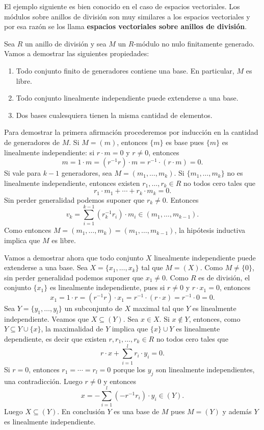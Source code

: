 El ejemplo siguiente es bien conocido en el caso de espacios vectoriales. Los módulos
sobre anillos de división son muy similares a los espacios vectoriales 
y por esa razón se los llama 
\textbf{espacios vectoriales sobre anillos de división}.

\begin{example}
Sea $R$ un anillo de división y sea $M$ un $R$-módulo no nulo finitamente generado. 
Vamos a demostrar las siguientes propiedades: 
\begin{enumerate}
\item Todo conjunto finito de generadores contiene una base. En particular, $M$ es libre. 
\item Todo conjunto linealmente independiente puede extenderse a una base.
\item Dos bases cualesquiera tienen la misma cantidad de elementos. 
\end{enumerate}

Para demostrar la primera afirmación procederemos por inducción en la cantidad de generadores de $M$. Si $M=(m)$, entonces
$\{m\}$ es base pues $\{m\}$ es linealmente independiente: si $r\cdot m=0$ y $r\ne 0$, entonces
\[
m=1\cdot m=(r^{-1}r)\cdot m=r^{-1}\cdot (r\cdot m)=0.
\]
Si vale para $k-1$ generadores, sea $M=(m_1,\dots,m_k)$. Si $\{m_1,\dots,m_k\}$ no es linealmente
independiente, entonces existen $r_1,\dots,r_k\in R$ no todos cero tales
que
\[
r_1\cdot m_1+\cdots+r_k\cdot m_k=0.
\]
Sin perder generalidad podemos suponer que $r_k\ne 0$. Entonces
\[
v_k=\sum_{i=1}^{k-1} (r_k^{-1}r_i)\cdot m_i\in (m_1,\dots,m_{k-1}).
\]
Como entonces $M=(m_1,\dots,m_k)=(m_1,\dots,m_{k-1})$, la hipótesis inductiva implica que
$M$ es libre. 

Vamos a demostrar ahora que todo
conjunto $X$ linealmente independiente puede extenderse a una base. 	Sea $X=\{x_1,\dots,x_k\}$ tal que $M=(X)$. 
Como $M\ne\{0\}$, sin perder generalidad podemos suponer que $x_1\ne 0$. Como $R$ es de división,
el conjunto $\{x_1\}$ es linealmente independiente, pues si $r\ne 0$ y $r\cdot x_1=0$, entonces 
\[
x_1=1\cdot r=(r^{-1}r)\cdot x_1=r^{-1}\cdot (r\cdot x)=r^{-1}\cdot 0=0.
\]
Sea $Y=\{y_1,\dots,y_l\}$ un subconjunto de $X$ maximal tal que $Y$ es linealmente independiente. Veamos que $X\subseteq (Y)$. Sea $x\in X$. Si $x\not\in Y$,  
entonces, como $Y\subseteq Y\cup \{x\}$, la maximalidad de $Y$ implica que $\{x\}\cup Y$ es linealmente dependiente, es decir
que existen $r,r_1,\dots,r_k\in R$ no todos cero tales que
\[
r\cdot x+\sum_{i=1}^l r_i\cdot y_i=0.
\]
Si $r=0$, entonces $r_1=\cdots=r_l=0$ porque los $y_j$ son linealmente independientes, una contradicción. Luego $r\ne 0$ y entonces
\[
x=-\sum_{i=1}^l (-r^{-1}r_i)\cdot y_i\in (Y).
\]
Luego $X\subseteq (Y)$. En conclusión $Y$ es una base de $M$ pues $M=(Y)$ 
y además $Y$ es linealmente independiente. 


\end{example}
